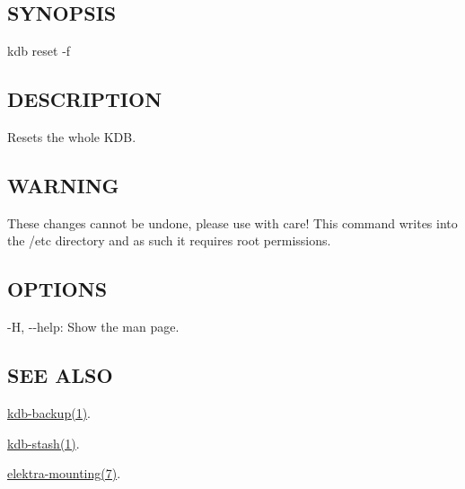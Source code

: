 \subsection*{S\+Y\+N\+O\+P\+S\+IS}

{\ttfamily kdb reset -\/f}

\subsection*{D\+E\+S\+C\+R\+I\+P\+T\+I\+ON}

Resets the whole K\+DB.

\subsection*{W\+A\+R\+N\+I\+NG}

These changes cannot be undone, please use with care! This command writes into the {\ttfamily /etc} directory and as such it requires root permissions.

\subsection*{O\+P\+T\+I\+O\+NS}


\begin{DoxyItemize}
\item {\ttfamily -\/H}, {\ttfamily -\/-\/help}\+: Show the man page.
\end{DoxyItemize}

\subsection*{S\+EE A\+L\+SO}


\begin{DoxyItemize}
\item \hyperlink{doc_help_kdb-backup_md}{kdb-\/backup(1)}.
\item \hyperlink{doc_help_kdb-stash_md}{kdb-\/stash(1)}.
\item \hyperlink{doc_help_elektra-mounting_md}{elektra-\/mounting(7)}. 
\end{DoxyItemize}
